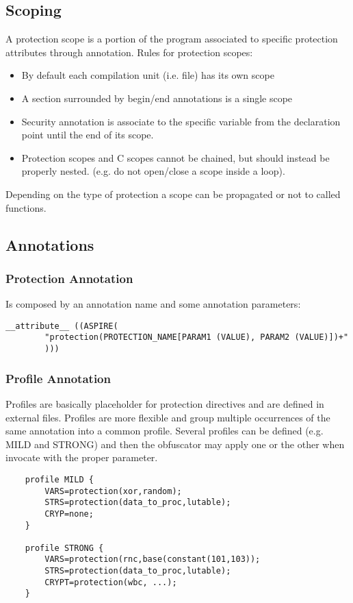 \subsection{Scoping}
A protection scope is a portion of the program associated to specific protection attributes through annotation.
Rules for protection scopes:
\begin{itemize}
\item By default each compilation unit (i.e. file) has its own scope
\item A section surrounded by begin/end annotations is a single scope
\item Security annotation is associate to the specific variable from the declaration point until the end of its scope.
\item Protection scopes and C scopes cannot be chained, but should instead be properly nested. (e.g. do not open/close a scope inside a loop).

\end{itemize}

Depending on the type of protection a scope can be propagated or not to called functions.

\subsection{Annotations}

\subsubsection{Protection Annotation}
Is composed by an annotation name and some annotation parameters:
\begin{lstlisting}
__attribute__ ((ASPIRE(
		"protection(PROTECTION_NAME[PARAM1 (VALUE), PARAM2 (VALUE)])+"
		)))
\end{lstlisting}

\subsubsection{Profile Annotation}
Profiles are basically placeholder for protection directives and are defined in external files. Profiles are more flexible and group multiple occurrences of the same annotation into a common profile. Several profiles can be defined (e.g. MILD and STRONG) and then the obfuscator may apply one or the other when invocate with the proper parameter.
\begin{lstlisting}
	profile MILD {
		VARS=protection(xor,random);
		STRS=protection(data_to_proc,lutable);
		CRYP=none;
	}
	
	profile STRONG {
		VARS=protection(rnc,base(constant(101,103));
		STRS=protection(data_to_proc,lutable);
		CRYPT=protection(wbc, ...);
	}
	
\end{lstlisting}

